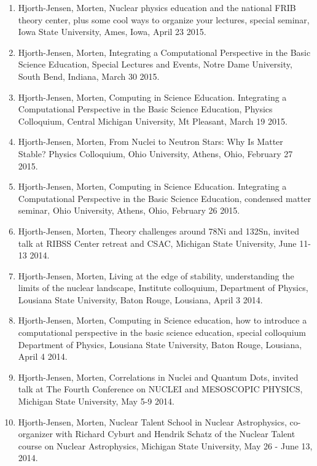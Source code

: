 \documentclass[a4wide,10pt]{article}
\begin{document}
\begin{enumerate}
\item Hjorth-Jensen, Morten, Nuclear physics education and the national FRIB theory center, plus some cool ways to organize your lectures, special seminar, Iowa State University, Ames, Iowa, April 23 2015.

\item Hjorth-Jensen, Morten, Integrating a Computational Perspective in the Basic Science Education, Special Lectures and Events, Notre Dame University, South Bend, Indiana, March 30 2015.

\item Hjorth-Jensen, Morten, Computing in Science Education.  Integrating a Computational Perspective in the Basic Science Education, Physics Colloquium, Central Michigan University, Mt Pleasant, March 19 2015.

\item Hjorth-Jensen, Morten, From Nuclei to Neutron Stars: Why Is Matter Stable? Physics Colloquium, Ohio University, Athens, Ohio,  February 27 2015.

\item Hjorth-Jensen, Morten, Computing in Science Education.  Integrating a Computational Perspective in the Basic Science Education, condensed matter seminar, Ohio University, Athens, Ohio,  February 26 2015.

\item Hjorth-Jensen, Morten, Theory challenges around 78Ni and 132Sn, invited talk at  RIBSS Center retreat and CSAC, Michigan State University, June 11-13 2014.

\item Hjorth-Jensen, Morten, Living at the edge of stability, understanding the limits of the nuclear landscape, Institute colloquium, Department of Physics, Lousiana State University, Baton Rouge, Lousiana, April 3 2014.

\item Hjorth-Jensen, Morten, Computing in Science education, how to introduce a computational perspective in the basic science education, special colloquium Department of Physics, Lousiana State University, Baton Rouge, Lousiana, April 4 2014.

\item Hjorth-Jensen, Morten, Correlations in Nuclei and Quantum Dots, invited talk at  The Fourth Conference on NUCLEI and MESOSCOPIC PHYSICS, Michigan State University, May 5-9 2014.

\item Hjorth-Jensen, Morten, Nuclear Talent School in Nuclear Astrophysics, co-organizer with Richard Cyburt and Hendrik Schatz of the Nuclear Talent course on Nuclear Astrophysics,  Michigan State University, May 26 - June 13, 2014. 


\end{enumerate}
\end{document}
